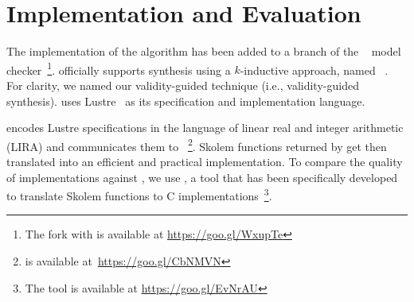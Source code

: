 \section{Implementation and Evaluation}
\label{sec:impl}

The implementation of the algorithm has been added to a branch of the  \jkind~\cite{jkind} model checker~\footnote{The \jkind fork with \jsynvg is available at \url{https://goo.gl/WxupTe}}.  \jkind officially supports synthesis
using a $k$-inductive approach, named \jsyn~\cite{KatisFGBGW16}. For clarity, we named
our validity-guided technique \jsynvg (i.e., validity-guided synthesis). \jkind uses Lustre~\cite{lustrev6} as its specification and implementation language.
\iffalse
, which functions as an intermediate representation to the Architecture Analysis and Design Language (\textsc{AADL})~\cite{feiler2006architecture}.
The latter is a high-level specification and analysis language with which
contracts are expressed, using the Assume-Guarantee Reasoning (\textsc{AGREE})
framework~\cite{NFM2012:CoGaMiWhLaLu}.
\andrew{it seems strange to be talking about AADL and maybe even AGREE  at all here.}

\fi
%
\jsynvg encodes Lustre specifications in the language of
linear real and integer arithmetic (LIRA)
and communicates them to \aeval~\footnote{\aeval is available at~\url{https://goo.gl/CbNMVN}}.
%
%
Skolem functions returned by \aeval get then translated %
into an efficient and practical implementation. To compare the quality of implementations against \jsyn, we use
\smtlibtoc, a tool that has been specifically developed to translate
  Skolem functions to C implementations~\footnote{The \smtlibtoc tool is available at \url{https://goo.gl/EvNrAU}}.





